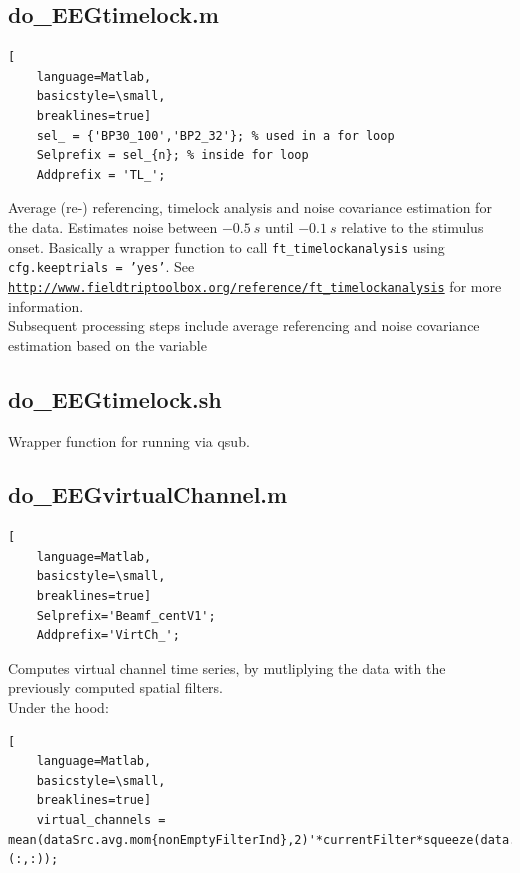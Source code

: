 \documentclass[12pt,a4paper]{scrartcl}
\begin{document}
\subsection{do\_EEGtimelock.m}
\label{m:timelock}
\begin{lstlisting}[
    language=Matlab,
    basicstyle=\small,
    breaklines=true]
    sel_ = {'BP30_100','BP2_32'}; % used in a for loop
    Selprefix = sel_{n}; % inside for loop
    Addprefix = 'TL_';
\end{lstlisting}
Average (re-) referencing, timelock analysis and noise covariance estimation for the data. Estimates noise between $-0.5~s$ until $-0.1~s$ relative to the stimulus onset. Basically a wrapper function to call \texttt{ft\_timelockanalysis} using \texttt{cfg.keeptrials = 'yes'}. See \href{http://www.fieldtriptoolbox.org/reference/ft\_timelockanalysis}{\nolinkurl{http://www.fieldtriptoolbox.org/reference/ft\_timelockanalysis}} for more information.\\

\noindent Subsequent processing steps include average referencing and noise covariance estimation based on the variable \\

\subsection{do\_EEGtimelock.sh}
\label{sh:timelock}
Wrapper function for running \texttt{} via qsub.\\

\subsection{do\_EEGvirtualChannel.m}
\label{m:virtch}
\begin{lstlisting}[
    language=Matlab,
    basicstyle=\small,
    breaklines=true]
    Selprefix='Beamf_centV1';
    Addprefix='VirtCh_';
\end{lstlisting}
Computes virtual channel time series, by mutliplying the data with the previously computed spatial filters.\\

\noindent Under the hood:
\begin{lstlisting}[
    language=Matlab,
    basicstyle=\small,
    breaklines=true]
    virtual_channels = mean(dataSrc.avg.mom{nonEmptyFilterInd},2)'*currentFilter*squeeze(data.trial{trial}(:,:));
\end{lstlisting}
\end{document}
